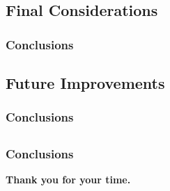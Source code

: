 \subsection{Final Considerations}

\begin{frame}
    \frametitle{Conclusions}

    
\end{frame}

\subsection{Future Improvements}

\begin{frame}
    \frametitle{Conclusions}


\end{frame}

\subsection{}

\begin{frame}
    \frametitle{Conclusions}

    \begin{center}
        \Huge{\textbf{Thank you for your time.}}
    \end{center}
\end{frame}